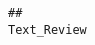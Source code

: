 \documentclass[
  11pt,
]{article}
\begin{document}
\begin{verbatim}
##                                                                                                                                                                                                                                                                                                                                                                                                                                                                                                                                                                                                                                                                                                                                                                                                                                                                                                                                                                                                                                                                                                                                                                                                                                                                                                                                                                                                                                                                                                                                                                                                                                                                                                                                                                                                                                                                                                                                                                                                                         Text_Review

\end{verbatim}
\end{document}
